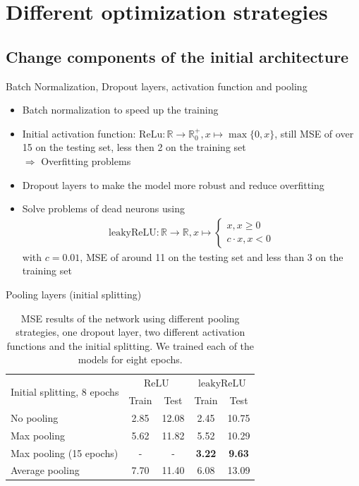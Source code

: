 \section{Different optimization strategies}
\subsection{Change components of the initial architecture}

\begin{frame}{Batch Normalization, Dropout layers, activation function and pooling}
	\begin{itemize}
		\item Batch normalization to speed up the training \cite{BatchNorm2015}
		\item Initial activation function: $\mathrm{ReLu}: \mathbb{R} \to \mathbb{R}_0^+, x \mapsto \max\{0,x\}$, still MSE of over 15 on the testing 
		set, less then 2 on the training set\\
		$\Rightarrow$ Overfitting problems
		\item Dropout layers \cite{Dropout2014} to make the model more robust and reduce overfitting
		\item Solve problems of dead neurons using
		\begin{align*}
		\mathrm{leakyReLU} : \mathbb{R} \to \mathbb{R}, x \mapsto \begin{cases}
		x, x \geq 0\\
		c \cdot x, x <0
		\end{cases}
		\end{align*}
		with $c = 0.01$, MSE of around 11 on the testing set and less than 3 on the training set
	\end{itemize}
\end{frame}

\begin{frame}{Pooling layers (initial splitting)}
	\begin{table}[!t]
		\normalsize
		\centering
		\begin{tabular}{lcccc}
			\toprule
			\multirow{2}{*}{Initial splitting, 8 epochs}  & \multicolumn{2}{c}{$\mathrm{ReLU}$} & \multicolumn{2}{c}{$\mathrm{leakyReLU}$} \\
			& Train & Test & Train & Test\\
			\midrule
			No pooling & 2.85 & 12.08 & 2.45 & 10.75 \\
			Max pooling & 5.62 & 11.82 & 5.52 & 10.29 \\
			Max pooling (15 epochs) & - & - & \textbf{3.22} & \textbf{9.63} \\
			Average pooling & 7.70 & 11.40 & 6.08 & 13.09\\
			\bottomrule
		\end{tabular}
		\caption{MSE results of the network using different pooling strategies, one dropout layer, two different activation functions and 
			the initial splitting. We trained each of the models for eight epochs.}
	\end{table}
\end{frame}

